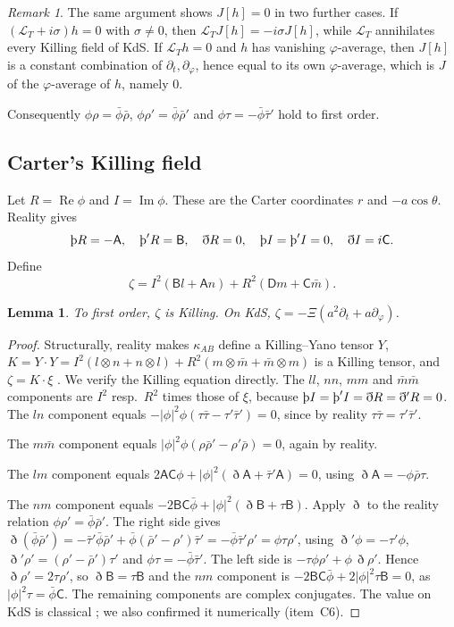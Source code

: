 \documentclass[11pt]{amsart}
\newtheorem{lemma}[theorem]{Lemma}
\theoremstyle{definition}
\theoremstyle{remark}
\newtheorem{remark}[theorem]{Remark}
\numberwithin{equation}{section}
\newcommand{\Th}{\text{\th}}
\newcommand{\cL}{\mathcal{L}}
\renewcommand{\Im}{\operatorname{Im}}
\renewcommand{\Re}{\operatorname{Re}}
\begin{document}
\begin{remark}\label{rem:Jvanish}
The same argument shows $J[h]=0$ in two further cases. If $(\cL_T+i\sigma)h=0$ with $\sigma\ne0$, then
$\cL_TJ[h]=-i\sigma J[h]$, while $\cL_T$ annihilates every Killing field of KdS. If $\cL_Th=0$ and $h$ has vanishing
$\varphi$-average, then $J[h]$ is a constant combination of $\partial_t,\partial_\varphi$, hence equal to its own
$\varphi$-average, which is $J$ of the $\varphi$-average of $h$, namely $0$.
\end{remark}

Consequently $\phi\rho=\bar\phi\bar\rho$, $\phi\rho'=\bar\phi\bar\rho'$ and $\phi\tau=-\bar\phi\bar\tau'$ hold to
first order.

\subsection{Carter's Killing field}
Let $R=\Re\phi$ and $I=\Im\phi$. These are the Carter coordinates $r$ and $-a\cos\theta$. Reality gives
\[
\Th R=-\mathsf A,\quad \Th'R=\mathsf B,\quad \eth R=0,\quad \Th I=\Th'I=0,\quad \eth I=i\mathsf C.
\]
Define
\[
\zeta=I^2(\mathsf Bl+\mathsf An)+R^2(\mathsf Dm+\mathsf C\bar m).
\]

\begin{lemma}\label{lem:zeta}
To first order, $\zeta$ is Killing. On KdS, $\zeta=-\Xi(a^2\partial_t+a\partial_\varphi)$.
\end{lemma}
\begin{proof}
Structurally, reality makes $\kappa_{AB}$ define a Killing--Yano tensor $Y$, $K=Y\cdot Y=I^2(l\otimes n+n\otimes l)+R^2(m\otimes\bar m+\bar m\otimes m)$
is a Killing tensor, and $\zeta=K\cdot\xi$ \cite{HS73,AA13}. We verify the Killing equation directly. The $ll$, $nn$, $mm$ and
$\bar m\bar m$ components are $I^2$ resp.\ $R^2$ times those of $\xi$, because $\Th I=\Th'I=\eth R=\eth'R=0$.
The $ln$ component equals $-|\phi|^2\phi(\tau\bar\tau-\tau'\bar\tau')=0$, since by reality
$\tau\bar\tau=\tau'\bar\tau'$.

The $m\bar m$ component equals $|\phi|^2\phi(\rho\bar\rho'-\rho'\bar\rho)=0$, again by reality.

The $lm$ component equals $2\mathsf A\mathsf C\phi+|\phi|^2(\eth\mathsf A+\bar\tau'\mathsf A)=0$, using $\eth\mathsf A=-\phi\bar\rho\tau$.

The $nm$ component equals $-2\mathsf B\mathsf C\bar\phi+|\phi|^2(\eth \mathsf B+\tau \mathsf B)$. Apply $\eth$ to the reality relation
$\phi\rho'=\bar\phi\bar\rho'$. The right side gives $\eth(\bar\phi\bar\rho')=-\bar\tau'\bar\phi\bar\rho'+\bar\phi(\bar\rho'-\rho')\bar\tau'=-\bar\phi\bar\tau'\rho'=\phi\tau\rho'$,
using $\eth'\phi=-\tau'\phi$, $\eth'\rho'=(\rho'-\bar\rho')\tau'$ and $\phi\tau=-\bar\phi\bar\tau'$. The left side is
$-\tau\phi\rho'+\phi\,\eth\rho'$. Hence $\eth\rho'=2\tau\rho'$, so $\eth \mathsf B=\tau \mathsf B$ and the $nm$ component is
$-2\mathsf B\mathsf C\bar\phi+2|\phi|^2\tau \mathsf B=0$, as $|\phi|^2\tau=\bar\phi \mathsf C$.
The remaining components are complex conjugates. The value on KdS is classical \cite{HS73}; we also confirmed it numerically (item~C6).
\end{proof}
\end{document}
